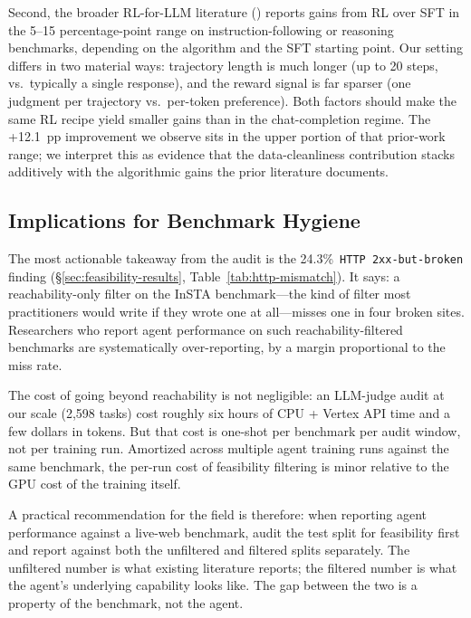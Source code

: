 \documentclass[12pt,a4paper]{report}
\begin{document}
Second, the broader RL-for-LLM literature (\cite{ouyang2022instructgpt,bai2022constitutional,shao2024deepseekmath,ahmadian2024rloo}) reports gains from RL over SFT in the 5--15 percentage-point range on instruction-following or reasoning benchmarks, depending on the algorithm and the SFT starting point. Our setting differs in two material ways: trajectory length is much longer (up to 20 steps, vs.~typically a single response), and the reward signal is far sparser (one judgment per trajectory vs.~per-token preference). Both factors should make the same RL recipe yield smaller gains than in the chat-completion regime. The +12.1~pp improvement we observe sits in the upper portion of that prior-work range; we interpret this as evidence that the data-cleanliness contribution stacks additively with the algorithmic gains the prior literature documents.

\subsection{Implications for Benchmark Hygiene}

The most actionable takeaway from the audit is the 24.3\%~\texttt{HTTP 2xx-but-broken} finding (\S\ref{sec:feasibility-results}, Table~\ref{tab:http-mismatch}). It says: a reachability-only filter on the InSTA benchmark---the kind of filter most practitioners would write if they wrote one at all---misses one in four broken sites. Researchers who report agent performance on such reachability-filtered benchmarks are systematically over-reporting, by a margin proportional to the miss rate.

The cost of going beyond reachability is not negligible: an LLM-judge audit at our scale (2{,}598 tasks) cost roughly six hours of CPU + Vertex API time and a few dollars in tokens. But that cost is one-shot per benchmark per audit window, not per training run. Amortized across multiple agent training runs against the same benchmark, the per-run cost of feasibility filtering is minor relative to the GPU cost of the training itself.

A practical recommendation for the field is therefore: when reporting agent performance against a live-web benchmark, audit the test split for feasibility first and report against both the unfiltered and filtered splits separately. The unfiltered number is what existing literature reports; the filtered number is what the agent's underlying capability looks like. The gap between the two is a property of the benchmark, not the agent.
\end{document}
